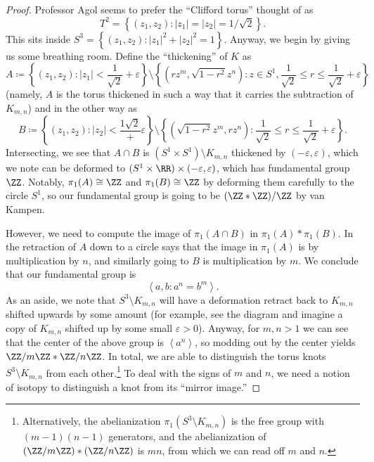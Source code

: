 \documentclass[../notes.tex]{subfiles}
\begin{document}
\begin{proof}
	Professor Agol seems to prefer the ``Clifford torus'' thought of as
	\[T^2=\left\{(z_1,z_2):\left|z_1\right|=\left|z_2\right|=1/\sqrt2\right\}.\]
	This sits inside $S^3=\left\{(z_1,z_2):\left|z_1\right|^2+\left|z_2\right|^2=1\right\}$. Anyway, we begin by giving us some breathing room. Define the ``thickening'' of $K$ as
	\[A\coloneqq\left\{(z_1,z_2):\left|z_1\right|<\frac1{\sqrt2}+\varepsilon\right\}\setminus\left\{\left(rz^m,\sqrt{1-r^2}z^n\right):z\in S^1,\frac1{\sqrt2}\le r\le\frac1{\sqrt2}+\varepsilon\right\}\]
	(namely, $A$ is the torus thickened in such a way that it carries the subtraction of $K_{m,n}$) and in the other way as
	\[B\coloneqq\left\{(z_1,z_2):\left|z_2\right|<\frac{1\sqrt2}+\varepsilon\right\}\setminus\left\{(\sqrt{1-r^2}z^m,rz^n):\frac1{\sqrt2}\le r\le\frac1{\sqrt2}+\varepsilon\right\}.\]
	Intersecting, we see that $A\cap B$ is $(S^1\times S^1)\setminus K_{m,n}$ thickened by $(-\varepsilon,\varepsilon)$, which we note can be deformed to $(S^1\times\RR)\times(-\varepsilon,\varepsilon)$, which has fundamental group $\ZZ$. Notably, $\pi_1(A)\cong\ZZ$ and $\pi_1(B)\cong\ZZ$ by deforming them carefully to the circle $S^1$, so our fundamental group is going to be $(\ZZ*\ZZ)/\ZZ$ by van Kampen.

	However, we need to compute the image of $\pi_1(A\cap B)$ in $\pi_1(A)*\pi_1(B)$. In the retraction of $A$ down to a circle says that the image in $\pi_1(A)$ is by multiplication by $n$, and similarly going to $B$ is multiplication by $m$. We conclude that our fundamental group is
	\[\left\langle a,b:a^n=b^m\right\rangle.\]
	As an aside, we note that $S^3\setminus K_{m,n}$ will have a deformation retract back to $K_{m,n}$ shifted upwards by some amount (for example, see the diagram and imagine a copy of $K_{m,n}$ shifted up by some small $\varepsilon>0$). Anyway, for $m,n>1$ we can see that the center of the above group is $\left\langle a^n\right\rangle$, so modding out by the center yields $\ZZ/m\ZZ*\ZZ/n\ZZ$. In total, we are able to distinguish the torus knots $S^3\setminus K_{m,n}$ from each other.\footnote{Alternatively, the abelianization $\pi_1(S^3\setminus K_{m,n})$ is the free group with $(m-1)(n-1)$ generators, and the abelianization of $(\ZZ/m\ZZ)*(\ZZ/n\ZZ)$ is $mn$, from which we can read off $m$ and $n$.} To deal with the signs of $m$ and $n$, we need a notion of isotopy to distinguish a knot from its ``mirror image.''
\end{proof}
\end{document}

